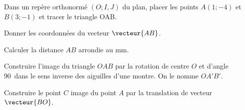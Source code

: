 \begin{myenumerate}
  \item Dans un repère orthonormé $(O;I,J)$ du plan, placer les points $A(1;-4)$ et $B(3;-1)$ et tracer le triangle OAB.
  \item Donner les coordonnées du vecteur $\vecteur{AB}$.
  \item Calculer la distance $AB$ arrondie au mm.
  \item Construire l'image du triangle $OAB$ par la rotation de centre
    $O$ et d'angle 90\degres\ dans le sens inverse des aiguilles d'une
    montre. On le nomme $OA'B'$.
  \item Construire le point $C$ image du point $A$ par la translation
    de vecteur $\vecteur{BO}$.
\end{myenumerate}